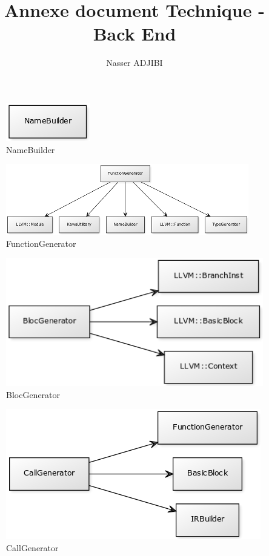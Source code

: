 \documentclass{article}
\title{Annexe document Technique - Back End}
\author{Nasser ADJIBI}
\begin{document}
\maketitle

\newpage

\begin{figure}
 \begin{center}
 \includegraphics{img/name.png} 
 \end{center}
 \caption{NameBuilder}
\end{figure}


\begin{figure}
 \begin{center}
 \includegraphics{img/function.png} 
 \end{center}
 \caption{FunctionGenerator}
\end{figure}

\begin{figure}
 \begin{center}
 \includegraphics{img/bloc.png} 
 \end{center}
 \caption{BlocGenerator}
\end{figure}

\begin{figure}
 \begin{center}
 \includegraphics{img/call.png} 
 \end{center}
 \caption{CallGenerator}
\end{figure}
\end{document}
